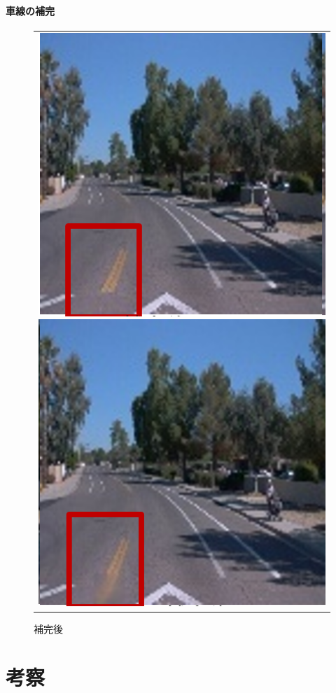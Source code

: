 \documentclass[a4j, 11pt]{jreport}
\begin{document}
\subsubsection{車線の補完}
\begin{figure}[H]
	\centering
	  \begin{tabular}{c}
		\begin{minipage}{0.50\hsize}
		  \centering
			\includegraphics[scale=0.5]
			{images/result/completion/result2-1.png}
			\caption{補完前}
			\label{fig:completion2-1}
		\end{minipage}
   
   
		\begin{minipage}{0.50\hsize}
		  \centering
			\includegraphics[scale=0.5]
			{images/result/completion/result2-2.png}
			\caption{補完後}
			\label{fig:completion2-2}
		\end{minipage} \\
	\end{tabular}
\end{figure}\chapter{考察}
\end{document}
